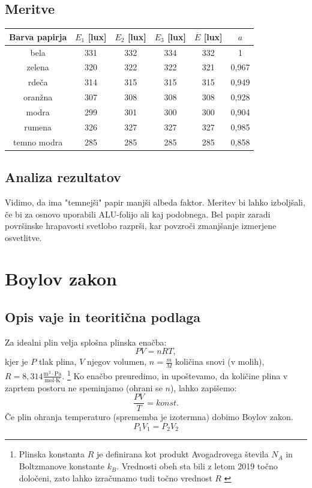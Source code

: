 \documentclass[12pt]{article}
\begin{document}
	\subsection*{Meritve}
	\begin{table}[!h]
		\centering
		\begin{tabular}{|c|c|c|c|c|c|}
		\hline
		Barva papirja & $E_1$ [lux] & $E_2$ [lux] 	& $E_3$ [lux] 	& $\overline{E}$ [lux] 	& $a$   \\ \hline
		bela          & 331			& 332			& 334			& 332 					& 1     \\ \hline
		zelena        & 320 		& 322 			& 322 			& 321 					& 0,967 \\ \hline
		rdeča         & 314 		& 315 			& 315 			& 315 					& 0,949 \\ \hline
		oranžna       & 307 		& 308 			& 308 			& 308 					& 0,928 \\ \hline
		modra         & 299 		& 301 			& 300 			& 300 					& 0,904 \\ \hline
		rumena        & 326 		& 327 			& 327 			& 327 					& 0,985 \\ \hline
		temno modra   & 285 		& 285 			& 285 			& 285 					& 0,858 \\ \hline
		\end{tabular}
	\end{table}

	\subsection*{Analiza rezultatov}
	Vidimo, da ima "temnejši" papir manjši albeda faktor. Meritev bi lahko izboljšali, če 
	bi za osnovo uporabili ALU-folijo ali kaj podobnega. Bel papir zaradi površinske 
	hrapavosti svetlobo razprši, kar povzroči zmanjšanje izmerjene osvetlitve.

\newpage
\section{Boylov zakon}
	\subsection*{Opis vaje in teoritična podlaga}
	Za idealni plin velja splošna plinska enačba:
	\begin{equation}
		PV = nRT,
	\end{equation}
	kjer je $P$ tlak plina, $V$ njegov volumen, $n = \frac{m}{M}$ količina snovi (v molih),
	$R = 8,314 \frac{\text{m}^3 \cdot \text{Pa}}{\text{mol} \cdot \text{K}}$.
	\footnote{Plinska konstanta $R$ je definirana kot produkt Avogadrovega števila $N_A$ 
	in Boltzmanove konstante $k_B$. Vrednosti obeh sta bili z letom 2019 točno določeni, zato
	lahko izračunamo tudi točno vrednost $R$ \cite{redef}} Ko enačbo preuredimo, in upoštevamo, da količine
	plina v zaprtem postoru ne speminjamo (ohrani se $n$), lahko zapišemo:
	\begin{equation}
			\frac{PV}{T} = konst.
	\end{equation}
	Če plin ohranja temperaturo (sprememba je izotermna) dobimo Boylov zakon.
	\begin{equation}
		P_1 V_1 = P_2 V_2
		\label{boyle}
	\end{equation}
\end{document}

